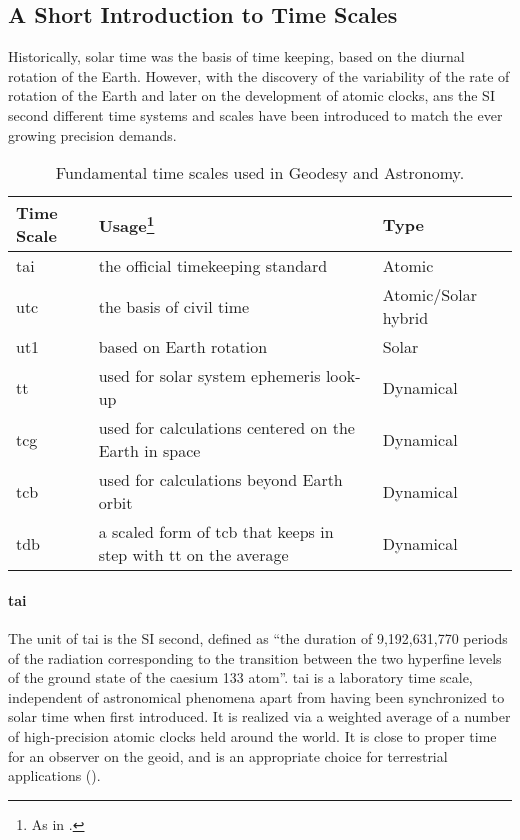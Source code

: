 \subsection{A Short Introduction to Time Scales}\label{ssec:time-scales}

Historically, solar time was the basis of time keeping, based on the diurnal rotation
of the Earth. However, with the  discovery of the variability of the 
rate of rotation of the Earth and later on the development of atomic clocks, 
ans the SI second different time systems and scales have been introduced to match the 
ever growing precision demands.

\begin{table}[h!]
    \centering
    \begin{tabular}{p{7cm}p{5cm}p{1cm}}
        \textbf{Time Scale} & \textbf{Usage\footnote{As in \cite{sofa2021ts}.}} & \textbf{Type} \\
        \hline
        \gls{tai} & the official timekeeping standard & Atomic \\
        \gls{utc} & the basis of civil time & Atomic/Solar hybrid\\
        \gls{ut1} & based on Earth rotation & Solar \\
        \gls{tt}  & used for solar system ephemeris look-up & Dynamical\\
        \gls{tcg} & used for calculations centered on the Earth in space  & Dynamical\\
        \gls{tcb} & used for calculations beyond Earth orbit  & Dynamical\\
        \gls{tdb} & a scaled form of \gls{tcb} that keeps in step with \gls{tt} on the average  & Dynamical\\
        \hline
    \end{tabular}
    \caption{Fundamental time scales used in Geodesy and Astronomy.}
    \label{table:time-scales}
  \end{table}

\paragraph{\gls{tai}}\label{par:tai}
The unit of \gls{tai} is the SI second, defined as ``the duration of 9,192,631,770 periods 
of the radiation corresponding to the transition between the two hyperfine levels of the ground state 
of the caesium 133 atom''. \gls{tai} is a laboratory time scale, independent of 
astronomical phenomena apart from having been synchronized to solar time when first 
introduced. It is realized via a weighted average of a number of high-precision atomic 
clocks held around the world. It is close to proper time for an observer on the
geoid, and is an appropriate choice for terrestrial applications (\cite{sofa2021ts}).

